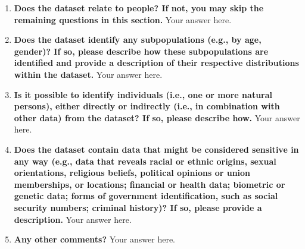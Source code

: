 \documentclass{article}
\begin{document}
\begin{enumerate}[leftmargin=0.65cm]
        \item \textbf{Does the dataset relate to people? If not, you may skip the remaining questions in this section.}
        \newline 
        Your answer here.
        \newline 
        
        \item \textbf{Does the dataset identify any subpopulations (e.g., by age, gender)? If so, please describe how these subpopulations are identified and provide a description of their respective distributions within the dataset.}
        \newline 
        Your answer here.
        \newline 
        
        \item \textbf{Is it possible to identify individuals (i.e., one or more natural persons), either directly or indirectly (i.e., in combination with other data) from the dataset? If so, please describe how.}
        \newline 
        Your answer here.
        \newline 
        
        \item \textbf{Does the dataset contain data that might be considered sensitive in any way (e.g., data that reveals racial or ethnic origins, sexual orientations, religious beliefs, political opinions or union memberships, or locations; financial or health data; biometric or genetic data; forms of government identification, such as social security numbers; criminal history)?  If so, please provide a description.}
        \newline 
        Your answer here.
        \newline 
        
        \item \textbf{Any other comments?}
        \newline 
        Your answer here.
        \newline 
    \end{enumerate}
    \\\\
    
\end{document}

